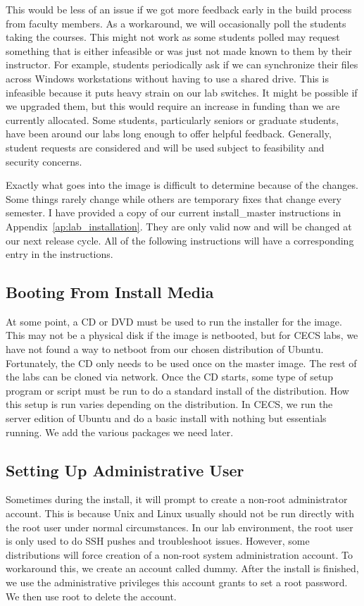 This would be less of an issue if we got more feedback early in the build process from faculty members.  As a workaround, we will occasionally poll the students taking the courses.  This might not work as some students polled may request something that is either infeasible or was just not made known to them by their instructor.  For example, students periodically ask if we can synchronize their files across Windows workstations without having to use a shared drive.  This is infeasible because it puts heavy strain on our lab switches.  It might be possible if we upgraded them, but this would require an increase in funding than we are currently allocated.  Some students, particularly seniors or graduate students, have been around our labs long enough to offer helpful feedback.  Generally, student requests are considered and will be used subject to feasibility and security concerns. 

Exactly what goes into the image is difficult to determine because of the changes.  Some things rarely change while others are temporary fixes that change every semester.  I have provided a copy of our current install\_master instructions in Appendix~\ref{ap:lab_installation}.  They are only valid now and will be changed at our next release cycle.  All of the following instructions will have a corresponding entry in the instructions. 

\subsection{Booting From Install Media}
At some point, a CD or DVD must be used to run the installer for the image.  This may not be a physical disk if the image is netbooted, but for CECS labs, we have not found a way to netboot from our chosen distribution of Ubuntu.  Fortunately, the CD only needs to be used once on the master image.  The rest of the labs can be cloned via network.  Once the CD starts, some type of setup program or script must be run to do a standard install of the distribution.  How this setup is run varies depending on the distribution.  In CECS, we run the server edition of Ubuntu and do a basic install with nothing but essentials running.  We add the various packages we need later.  

\subsection{Setting Up Administrative User}
Sometimes during the install, it will prompt to create a non-root administrator account.  This is because Unix and Linux usually should not be run directly with the root user under normal circumstances.  In our lab environment, the root user is only used to do SSH pushes and troubleshoot issues.  However, some distributions will force creation of a non-root system administration account.  To workaround this, we create an account called dummy.  After the install is finished, we use the administrative privileges this account grants to set a root password. We then use root to delete the account.  


